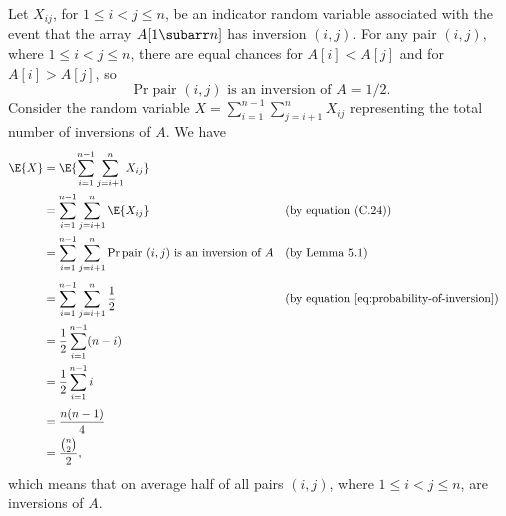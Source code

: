 Let $X_{ij}$, for $1\le i<j\le n$, be an indicator random variable associated with the event that the array $A[1\subarr n]$ has inversion $(i,j)$.
For any pair $(i,j)$, where $1\le i<j\le n$, there are equal chances for $A[i]<A[j]$ and for $A[i]>A[j]$, so
\begin{equation} \label{eq:probability-of-inversion}
    \Pr{\text{pair $(i,j)$ is an inversion of $A$}} = 1/2.
\end{equation}
Consider the random variable $X=\sum_{i=1}^{n-1}\sum_{j=i+1}^nX_{ij}$ representing the total number of inversions of $A$.
We have
\begin{align*}
    \E{X} &= \E{\sum_{i=1}^{n-1}\sum_{j=i+1}^nX_{ij}} \\
    &= \sum_{i=1}^{n-1}\sum_{j=i+1}^n\E{X_{ij}} && \text{(by equation (C.24))} \\
    &= \sum_{i=1}^{n-1}\sum_{j=i+1}^n\Pr{\text{pair $(i,j)$ is an inversion of $A$}} && \text{(by Lemma 5.1)} \\[1mm]
    &= \sum_{i=1}^{n-1}\sum_{j=i+1}^n\frac{1}{2} && \text{(by equation \eqref{eq:probability-of-inversion})} \\
    &= \frac{1}{2}\sum_{i=1}^{n-1}(n-i) \\
    &= \frac{1}{2}\sum_{i=1}^{n-1}i \\[1mm]
    &= \frac{n(n-1)}{4} \\
    &= \frac{\binom{n}{2}}{2},
\end{align*}
which means that on average half of all pairs $(i,j)$, where $1\le i<j\le n$, are inversions of $A$.
